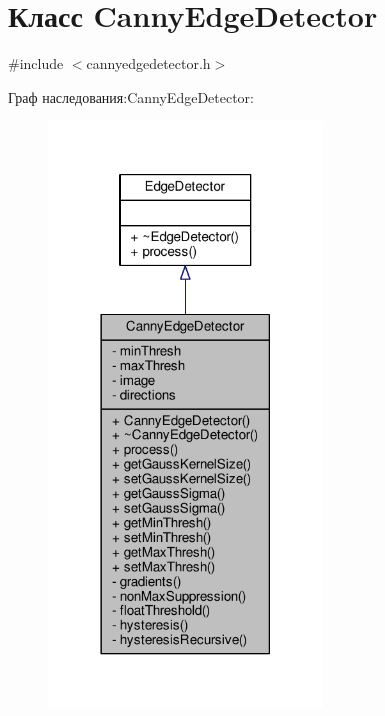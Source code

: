 \hypertarget{class_canny_edge_detector}{}\section{Класс Canny\+Edge\+Detector}
\label{class_canny_edge_detector}


{\ttfamily \#include $<$cannyedgedetector.\+h$>$}



Граф наследования\+:Canny\+Edge\+Detector\+:
\nopagebreak
\begin{figure}[H]
\begin{center}
\leavevmode
\includegraphics[width=206pt]{d3/d83/class_canny_edge_detector__inherit__graph}
\end{center}
\end{figure}


